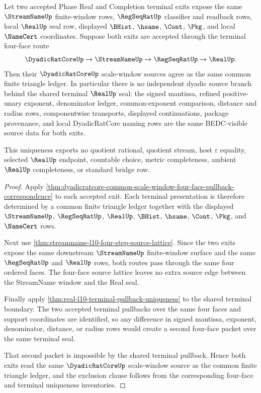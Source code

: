 \begin{theorem}
\label{thm:dyadicratcore-scale-window-real-exit-source-uniqueness}
Let two accepted Phase Real and Completion terminal exits expose the same $\StreamNameUp$ finite-window rows, $\RegSeqRatUp$ classifier and readback rows, local $\RealUp$ seal row, displayed $\BHist$, $\hsame$, $\Cont$, $\Pkg$, and local $\NameCert$ coordinates. Suppose both exits are accepted through the terminal four-face route
$$
\DyadicRatCoreUp \to \StreamNameUp \to \RegSeqRatUp \to \RealUp .
$$
Then their $\DyadicRatCoreUp$ scale-window sources agree as the same common finite triangle ledger. In particular there is no independent dyadic source branch behind the shared terminal $\RealUp$ seal: the signed mantissa, refined positive-unary exponent, denominator ledger, common-exponent comparison, distance and radius rows, componentwise transports, displayed continuations, package provenance, and local DyadicRatCore naming rows are the same BEDC-visible source data for both exits.

This uniqueness exports no quotient rational, quotient stream, host $\varepsilon$ equality, selected $\RealUp$ endpoint, countable choice, metric completeness, ambient $\RealUp$ completeness, or standard bridge row.
\end{theorem}
\begin{proof}
Apply \autoref{thm:dyadicratcore-common-scale-window-four-face-pullback-correspondence} to each accepted exit. Each terminal presentation is therefore determined by a common finite triangle ledger together with the displayed $\StreamNameUp$, $\RegSeqRatUp$, $\RealUp$, $\BHist$, $\hsame$, $\Cont$, $\Pkg$, and $\NameCert$ rows.

Next use \autoref{thm:streamname-l10-four-step-source-lattice}. Since the two exits expose the same downstream $\StreamNameUp$ finite-window surface and the same $\RegSeqRatUp$ and $\RealUp$ rows, both routes pass through the same four ordered faces. The four-face source lattice leaves no extra source edge between the StreamName window and the Real seal.

Finally apply \autoref{thm:real-l10-terminal-pullback-uniqueness} to the shared terminal boundary. The two accepted terminal pullbacks over the same four faces and support coordinates are identified, so any difference in signed mantissa, exponent, denominator, distance, or radius rows would create a second four-face packet over the same terminal seal.

That second packet is impossible by the shared terminal pullback. Hence both exits read the same $\DyadicRatCoreUp$ scale-window source as the common finite triangle ledger, and the exclusion clause follows from the corresponding four-face and terminal uniqueness inventories.
\end{proof}

